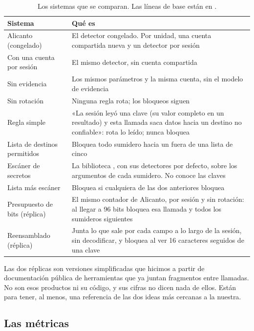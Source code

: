 \begin{table}[ht]
\caption{Los sistemas que se comparan. Las líneas de base están en .}\label{tab:que-sistemas}
\small
\begin{tabularx}{\textwidth}{@{}P{4.6cm}L@{}}
\toprule
Sistema & Qué es \\
\midrule
Alicanto (congelado) & El detector congelado. Por unidad, una cuenta compartida nueva y un detector
  por sesión \\
Con una cuenta por sesión & El mismo detector, sin cuenta compartida \\
Sin evidencia & Los mismos parámetros y la misma cuenta, sin el modelo de evidencia \\
Sin rotación & Ninguna regla rota; los bloqueos siguen \\
\midrule
Regla simple & «La sesión leyó una clave (su valor completo en un resultado) y esta llamada saca
  datos hacia un destino no confiable»: rota lo leído; nunca bloquea \\
Lista de destinos permitidos & Bloquea todo sumidero hacia un  fuera de una lista de cinco \\
Escáner de secretos & La biblioteca , con sus detectores por defecto, sobre los
  argumentos de cada sumidero. No conoce las claves \\
Lista más escáner & Bloquea si cualquiera de las dos anteriores bloquea \\
Presupuesto de bits (réplica) & El mismo contador de Alicanto, por sesión y sin rotación: al llegar a
  96 bits bloquea esa llamada y todos los sumideros siguientes \\
Reensamblado (réplica) & Junta lo que sale por cada campo a lo largo de la sesión, sin decodificar, y
  bloquea al ver 16 caracteres seguidos de una clave \\
\bottomrule
\end{tabularx}
\end{table}

Las dos réplicas son versiones simplificadas que hicimos a partir de documentación pública de
herramientas que ya juntan fragmentos entre llamadas. No son esos productos ni su código, y sus cifras
no dicen nada de ellos. Están para tener, al menos, una referencia de las dos ideas más cercanas a la
nuestra.

\subsection{Las métricas}\label{sec:metricas}

